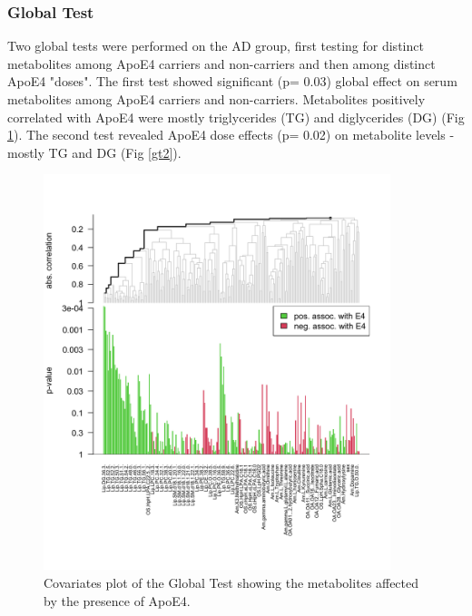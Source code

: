 \documentclass{amsart}
\begin{document}
\subsubsection{Global Test}
Two global tests were performed on the AD group, first testing for distinct metabolites among ApoE4 carriers and non-carriers and then among distinct ApoE4 "doses". The first test showed significant (p= 0.03) global effect on serum metabolites among ApoE4 carriers and non-carriers. Metabolites positively correlated with ApoE4 were mostly triglycerides (TG) and diglycerides (DG) (Fig \ref{gt1}). The second test revealed ApoE4 dose effects (p= 0.02) on metabolite levels  -mostly TG and DG (Fig \ref{gt2}).
\begin{figure}[htb]
    \includegraphics[width=0.9\textwidth]{figures/gt1.png}
      \caption{Covariates plot of the Global Test showing the metabolites affected by the presence of ApoE4.}
    \label{gt1}
  \end{figure}
\end{document}
